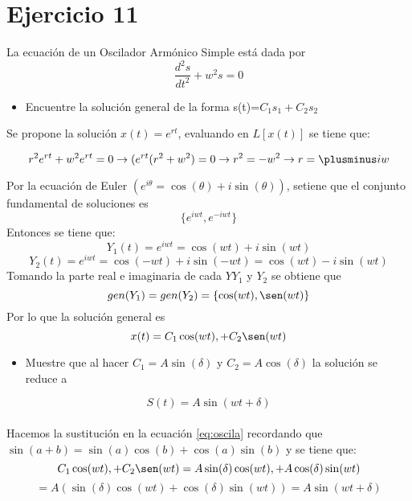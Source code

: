\section{Ejercicio 11}
La ecuación de un Oscilador Armónico Simple está dada por 
\begin{equation*}
\frac{d^{2}s}{dt^{2}} + w^{2}s=0
\end{equation*}

\begin{itemize}
\item Encuentre la solución general de la forma s(t)=$C_{1} s_{1} + C_{2} s_{2}$
\end{itemize}

Se propone la solución $x(t)=e^{rt}$, evaluando en $L[x(t)]$ se tiene que:

\begin{equation*}
  r^{2} e^{rt} + w^{2} e^{rt}=0 \rightarrow  (e^{rt}( r^{2}+ w^{2}) =0 \\

\rightarrow r^{2}= - w^{2} \rightarrow r= \plusminus iw \\  
\end{equation*}


Por la ecuación de Euler $(e^{i\theta}=\cos(\theta)+i\sin(\theta))$, setiene que  el conjunto fundamental de soluciones es \\
\begin{equation*}
\{ e^{iwt}, e^{-iwt}\}
\end{equation*}
Entonces se tiene que:
\begin{equation*}
Y_{1}(t)= e^{iwt}=\cos(wt)+i\sin(wt)
\end{equation*}
\begin{equation*}
Y_{2}(t)= e^{iwt}=\cos(-wt)+i\sin(-wt)=\cos(wt)-i\sin(wt)
\end{equation*}
Tomando la parte real e imaginaria de cada $Y Y_{1}$ y $Y_{2}$ se obtiene que
\begin{equation*}
gen(Y_{1}) =gen(Y_{2})=\{\cos(wt),\sen(wt)\}
\end{equation*}
Por lo que la solución general es \\
\begin{equation}
x(t)=C_{1} \cos(wt),+ C_{2}\sen(wt)
\label{eq:oscila}
\end{equation}

\begin{itemize}
\item Muestre que al hacer $C_{1}=A\sin(\delta)$ y $ C_{2}=A\cos(\delta)$ la solución se reduce a 
\end{itemize}
\begin{equation*}
S(t)=A\sin(wt+\delta)
\end{equation*}
\\
Hacemos la sustitución en la ecuación \ref{eq:oscila} recordando que $\sin(a+b)=\sin(a)\cos(b)+\cos(a)\sin(b)$ y se tiene que:
\begin{equation*}
C_{1} \cos(wt),+ C_{2}\sen(wt)= A\sin(\delta)  \cos(wt),+ A\cos(\delta)\sin(wt)
\end{equation*}
\begin{equation*}
= A(\sin(\delta)\cos(wt)+ \cos(\delta)\sin(wt))=A\sin(wt + \delta)
\end{equation*}
